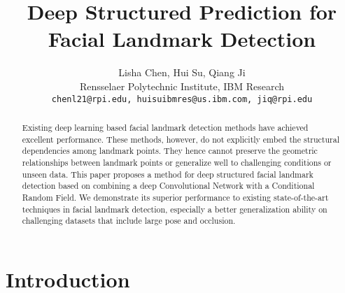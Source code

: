\documentclass{article}
\title{Deep Structured Prediction for Facial Landmark Detection}
\author{
Lisha Chen, Hui Su, Qiang Ji\\
Rensselaer Polytechnic Institute,
IBM Research\\
  \texttt{chenl21@rpi.edu, huisuibmres@us.ibm.com, jiq@rpi.edu} \\
}
\begin{document}
\maketitle

\begin{abstract}

Existing deep learning based facial landmark detection methods have achieved excellent performance. These methods, however, do not explicitly embed the structural dependencies among landmark points. They hence cannot preserve the geometric relationships between landmark points or generalize well to challenging conditions or unseen data. This paper proposes a method for deep structured facial landmark detection based on combining a deep Convolutional Network with a Conditional Random Field. We demonstrate its superior performance to existing state-of-the-art techniques in facial landmark detection, especially a better generalization ability on challenging datasets that include large pose and occlusion.

  
\end{abstract}

\section{Introduction} \label{sec:introduction}
\end{document}
